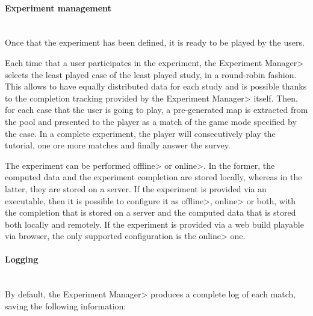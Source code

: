 \paragraph{Experiment management}

\mbox{}\\

{\setlength{\parindent}{0cm}
Once that the experiment has been defined, it is ready to be played  by the users.}

\par

Each time that a user participates in the experiment, the \<Experiment Manager> selects the least played case of the least played study, in a round-robin fashion. This allows to have equally distributed data for each study and is possible thanks to the completion tracking provided by the \<Experiment Manager> itself. Then, for each case that the user is going to play, a pre-generated map is extracted from the pool and presented to the player as a match of the game mode specified by the case. In a complete experiment, the player will consecutively play the tutorial, one ore more matches and finally answer the survey.

\par

The experiment can be performed \<offline> or \<online>. In the former, the computed data and the experiment completion are stored locally, whereas in the latter, they are stored on a server. If the experiment is provided via an executable, then it is possible to configure it as \<offline>, \<online> or both, with the completion that is stored on a server and the computed data that is stored both locally and remotely. If the experiment is provided via a web build playable via browser, the only supported configuration is the \<online> one. 

\paragraph{Logging}

\mbox{}\\

{\setlength{\parindent}{0cm}
By default, the \<Experiment Manager> produces a complete log of each match, saving the following information:}

